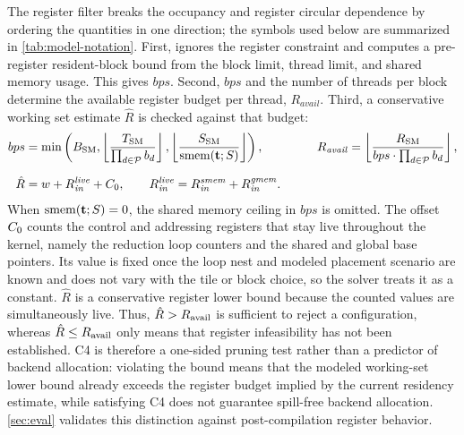 The register filter breaks the occupancy and register circular dependence by ordering the quantities in one direction; the symbols used below are summarized in \autoref{tab:model-notation}. First, \name ignores the register constraint and computes a pre-register resident-block bound from the block limit, thread limit, and shared memory usage. This gives \(bps\). Second, \(bps\) and the number of threads per block determine the available register budget per thread, \(R_{\mathit{avail}}\). Third, a conservative working set estimate \(\hat{R}\) is checked against that budget:
\begingroup
\renewcommand{\arraystretch}{1.12}
\begin{equation}
\begin{aligned}
bps
&= \min\left(
   B_{\mathrm{SM}},
   \left\lfloor \dfrac{T_{\mathrm{SM}}}{\prod_{d\in\mathcal{P}} b_d} \right\rfloor,
   \left\lfloor
   \dfrac{S_{\mathrm{SM}}}{\operatorname{smem}(\mathbf{t};S)}
   \right\rfloor
   \right),
&\qquad
R_{\mathit{avail}}
&= \left\lfloor
   \dfrac{R_{\mathrm{SM}}}{bps \cdot \prod_{d\in\mathcal{P}} b_d}
   \right\rfloor,\\[1.5ex]
\hat{R}
&= w + R^{\mathit{live}}_{\mathit{in}} + C_0,
\qquad
R^{\mathit{live}}_{\mathit{in}}
= R^{\mathit{smem}}_{\mathit{in}} + R^{\mathit{gmem}}_{\mathit{in}}.
\end{aligned}
\label{eq:resident-blocks}
\end{equation}
\endgroup
When \(\operatorname{smem}(\mathbf{t};S)=0\), the shared memory ceiling in \(bps\) is omitted. The offset \(C_0\) counts the control and addressing registers that stay live throughout the kernel, namely the reduction loop counters and the shared and global base pointers. Its value is fixed once the loop nest and modeled placement scenario are known and does not vary with the tile or block choice, so the solver treats it as a constant. \(\hat R\) is a conservative register lower bound because the counted values are simultaneously live.  Thus, \(\hat R > R_{\rm avail}\) is sufficient to reject a configuration, whereas \(\hat R \le R_{\rm avail}\) only means that register infeasibility has not been established. C4 is therefore a one-sided pruning test rather than a predictor of backend allocation: violating the bound means that the modeled working-set lower bound already exceeds the register budget implied by the current residency estimate, while satisfying C4 does not guarantee spill-free backend allocation. \autoref{sec:eval} validates this distinction against post-compilation register behavior. 

